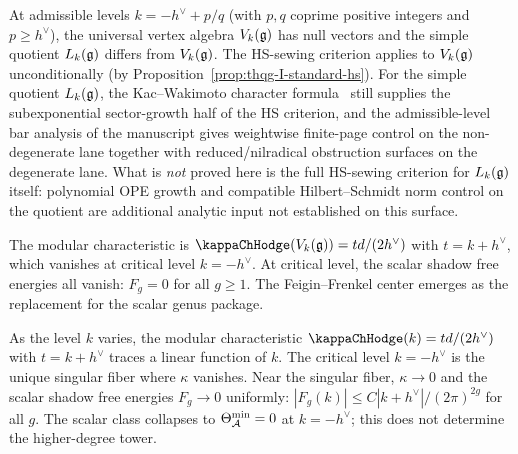 \begin{remark}
At admissible levels $k = -h^\vee + p/q$ (with $p,q$ coprime positive integers and $p \geq h^\vee$), the universal vertex algebra $V_k(\mathfrak{g})$ has null vectors and the simple quotient $L_k(\mathfrak{g})$ differs from $V_k(\mathfrak{g})$. The HS-sewing criterion applies to $V_k(\mathfrak{g})$ unconditionally (by Proposition~\ref{prop:thqg-I-standard-hs}). For the simple quotient $L_k(\mathfrak{g})$, the Kac--Wakimoto character formula~\cite{KW88} still supplies the subexponential sector-growth half of the HS criterion, and the admissible-level bar analysis of the manuscript gives weightwise finite-page control on the non-degenerate lane together with reduced/nilradical obstruction surfaces on the degenerate lane. What is \emph{not} proved here is the full HS-sewing criterion for $L_k(\mathfrak{g})$ itself: polynomial OPE growth and compatible Hilbert--Schmidt norm control on the quotient are additional analytic input not established on this surface.

The modular characteristic is $\kappaChHodge(V_k(\fg)) = td/(2h^\vee)$ with $t = k + h^\vee$, which vanishes at critical level $k = -h^\vee$. At critical level, the scalar shadow free energies all vanish: $F_g = 0$ for all $g \geq 1$. The Feigin--Frenkel center emerges as the replacement for the scalar genus package.
\end{remark}

\begin{remark}
As the level $k$ varies, the modular characteristic $\kappaChHodge(k) = td/(2h^\vee)$ with $t = k + h^\vee$ traces a linear function of $k$. The critical level $k = -h^\vee$ is the unique singular fiber where $\kappa$ vanishes. Near the singular fiber, $\kappa \to 0$ and the scalar shadow free energies $F_g \to 0$ uniformly: $|F_g(k)| \leq C |k + h^\vee| / (2\pi)^{2g}$ for all $g$. The scalar class collapses to $\Theta_{\mathcal{A}}^{\min} = 0$ at $k = -h^\vee$; this does not determine the higher-degree tower.
\end{remark}

